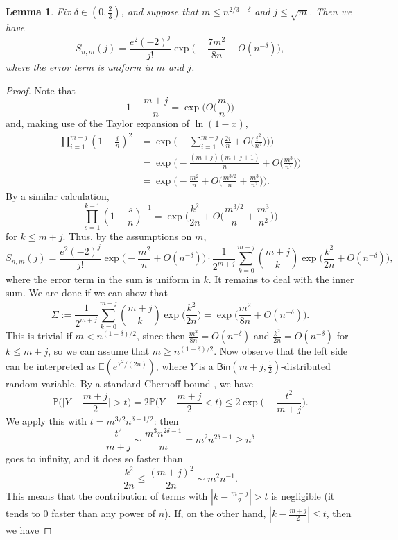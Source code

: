 \documentclass[a4paper,12pt,reqno]{amsart}
\newtheorem{lemma}{Lemma}
\theoremstyle{remark}
\newcommand{\Ex}{\mathbb{E}}
\newcommand{\IP}{\mathbb{P}}
\newcommand{\Bin}{\mathsf{Bin}}
\newcommand{\gd}{\delta}
\begin{document}
\begin{lemma}\label{lem:Snm-lem}
Fix $\gd \in (0,\frac23)$, and suppose that $m \leq n^{2/3-\gd}$ and $j \leq \sqrt{m}$. Then we have
\[  S_{n,m}(j) = \frac{e^2(-2)^j}{j!} \exp \Big( {-}\frac{7m^2}{8n} + O(n^{-\gd}) \Big),\]
where the error term is uniform in $m$ and $j$.
\end{lemma}

\begin{proof}
Note that
\[1-\frac{m+j}{n} = \exp \Big( O \Big( \frac{m}{n} \Big) \Big)\]  and, making use of the Taylor expansion of $\ln(1-x)$,
\begin{align*}
\prod_{i=1}^{m+j} \left(1-\frac{i}{n}\right)^2
&= \exp \Big( {-} \sum_{i=1}^{m+j} \Big( \frac{2i}{n} + O \Big( \frac{i^2}{n^2} \Big) \Big) \Big) \\
&= \exp \Big( {-} \frac{(m+j)(m+j+1)}{n}
+ O \Big( \frac{m^3}{n^2} \Big) \Big) \\
&= \exp \Big( {-} \frac{m^2}{n} + O \Big( \frac{m^{3/2}}{n} + \frac{m^3}{n^2} \Big) \Big).
\end{align*}
By a similar calculation,
\[\prod_{s=1}^{k-1} \left(1-\frac{s}{n}\right)^{-1} = \exp\Big(
\frac{k^2}{2n} + O \Big( \frac{m^{3/2}}{n} + \frac{m^3}{n^2} \Big) \Big)
\]
for $k \leq m+j$. Thus, by the assumptions on $m$, 
\[S_{n,m}(j) = \frac{e^2(-2)^j}{j!} 
\exp \Big( {-} \frac{m^2}{n} + O(n^{-\gd}) \Big) \cdot 
\frac{1}{2^{m+j}} \sum_{k=0}^{m+j} \binom{m+j}{k} \exp \Big( \frac{k^2}{2n} + O(n^{-\gd}) \Big),
\]
where the error term in the sum is uniform in $k$. It remains to deal with the inner sum. We are done if we can show that
\[\Sigma := \frac{1}{2^{m+j}} \sum_{k=0}^{m+j} \binom{m+j}{k}
\exp \Big( \frac{k^2}{2n} \Big) = \exp \Big( \frac{m^2}{8n} + O(n^{-\gd}) \Big).
\]
This is trivial if $m < n^{(1-\gd)/2}$, since then $\frac{m^2}{8n} = O(n^{-\gd})$ and $\frac{k^2}{2n} = O(n^{-\gd})$ for $k \leq m+j$, so we can assume that $m \geq n^{(1-\gd)/2}$.
Now observe that the left side can be interpreted as $\Ex(e^{Y^2/(2n)})$, where $Y$ is a $\Bin(m+j,\frac12)$-distributed random variable. By a standard Chernoff bound \cite[Theorem 2.1]{JLR00}, we have
\[\IP\Big(\Big|Y - \frac{m+j}{2}\Big| > t\Big) = 2\IP\Big(Y - \frac{m+j}{2} < t\Big) \leq 2 \exp \Big( {-} \frac{t^2}{m+j} \Big).\]
We apply this with $t = m^{3/2} n^{\gd - 1/2}$: then
\[\frac{t^2}{m+j} \sim \frac{m^3 n^{2\gd-1}}{m} = m^2n^{2\gd-1} \geq n^{\gd}
\]
goes to infinity, and it does so faster than
\[\frac{k^2}{2n} \leq \frac{(m+j)^2}{2n} \sim m^2n^{-1}.\]
This means that the contribution of terms with $|k - \frac{m+j}{2}| > t$ is negligible (it tends to $0$ faster than any power of $n$). If, on the other hand, $|k - \frac{m+j}{2}| \leq t$, then we have

\end{proof}
\end{document}
